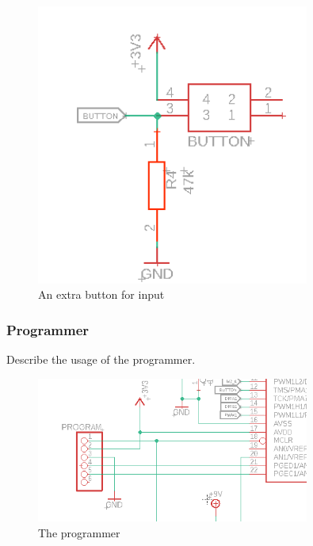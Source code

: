 \begin{figure}[htb]
    \centering
    \includegraphics[width=0.8\textwidth]{figures/hardware/Button.PNG}
    \caption{An extra button for input}
    \label{fig:button}
\end{figure}

\FloatBarrier


\subsubsection{Programmer}

Describe the usage of the programmer.

\begin{figure}[htb]
    \centering
    \includegraphics[width=0.8\textwidth]{figures/hardware/Programmer.PNG}
    \caption{The programmer}
    \label{fig:programmer}
\end{figure}

\FloatBarrier


